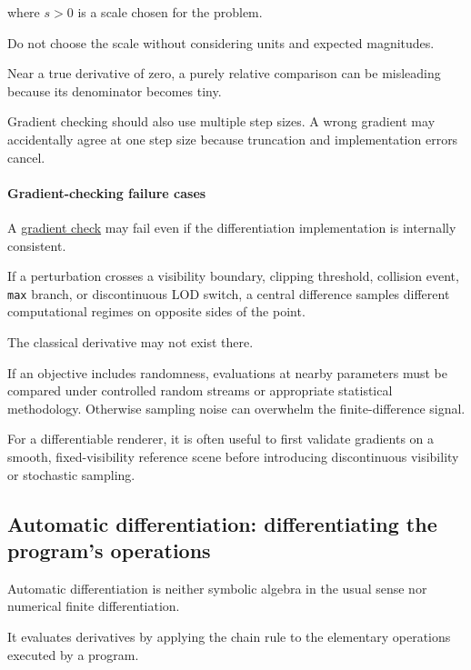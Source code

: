 where \(s>0\) is a scale chosen for the problem.

Do not choose the scale without considering units and expected magnitudes.

Near a true derivative of zero, a purely relative comparison can be misleading because its denominator becomes tiny.

Gradient checking should also use multiple step sizes. A wrong gradient may accidentally agree at one step size because truncation and implementation errors cancel.

\paragraph{Gradient-checking failure cases}\label{02-foundations-ii-ch022-gradient-checking-failure-cases}

A \hyperref[02-foundations-ii-ch022-numerical-differentiation-and-automatic-differentiation]{gradient check} may fail even if the differentiation implementation is internally consistent.

If a perturbation crosses a visibility boundary, clipping threshold, collision event, \texttt{max} branch, or discontinuous LOD switch, a central difference samples different computational regimes on opposite sides of the point.

The classical derivative may not exist there.

If an objective includes randomness, evaluations at nearby parameters must be compared under controlled random streams or appropriate statistical methodology. Otherwise sampling noise can overwhelm the finite-difference signal.

For a differentiable renderer, it is often useful to first validate gradients on a smooth, fixed-visibility reference scene before introducing discontinuous visibility or stochastic sampling.

\subsection{Automatic differentiation: differentiating the program's operations}\label{02-foundations-ii-ch022-automatic-differentiation-differentiating-the-programs-operations}

Automatic differentiation is neither symbolic algebra in the usual sense nor numerical finite differentiation.

It evaluates derivatives by applying the chain rule to the elementary operations executed by a program.

